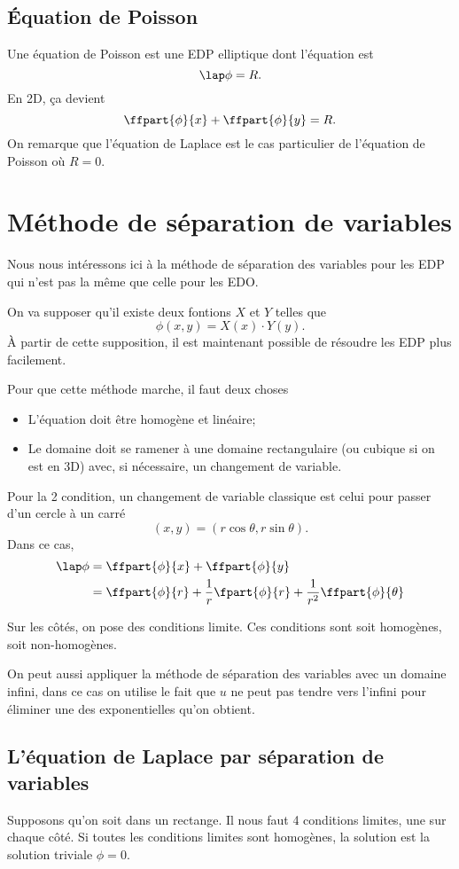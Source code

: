 \subsection{Équation de Poisson}
Une équation de Poisson est une EDP elliptique dont l'équation est
\[ \lap \phi = R. \]
En 2D, ça devient
\[ \ffpart{\phi}{x} + \ffpart{\phi}{y} = R. \]
On remarque que l'équation de Laplace est le cas particulier de
l'équation de Poisson où $R = 0$.

\section{Méthode de séparation de variables}
Nous nous intéressons ici à la méthode de séparation des variables pour les EDP
qui n'est pas la même que celle pour les EDO.

On va supposer qu'il existe deux fontions $X$ et $Y$ telles que
\[ \phi(x, y) = X(x) \cdot Y(y). \]
À partir de cette supposition, il est maintenant possible de résoudre
les EDP plus facilement.

Pour que cette méthode marche, il faut deux choses
\begin{itemize}
  \item L'équation doit être homogène et linéaire;
  \item Le domaine doit se ramener à une domaine rectangulaire
    (ou cubique si on est en 3D)
    avec, si nécessaire, un changement de variable.
\end{itemize}
Pour la 2\ieme{} condition, un changement de variable classique est
celui pour passer d'un cercle à un carré
\[ (x, y) = (r\cos\theta, r\sin\theta). \]
Dans ce cas,
\begin{align*}
  \lap \phi & = \ffpart{\phi}{x} + \ffpart{\phi}{y}\\
  & = \ffpart{\phi}{r} + \frac{1}{r}\fpart{\phi}{r}
  + \frac{1}{r^2}\ffpart{\phi}{\theta}
\end{align*}

Sur les côtés, on pose des conditions limite.
Ces conditions sont soit homogènes, soit non-homogènes.

On peut aussi appliquer la méthode de séparation des variables
avec un domaine infini, dans ce cas on utilise le fait
que $u$ ne peut pas tendre vers l'infini pour éliminer une des
exponentielles qu'on obtient.

\subsection{L'équation de Laplace par séparation de variables}
Supposons qu'on soit dans un rectange.
Il nous faut 4 conditions limites, une sur chaque côté.
Si toutes les conditions limites sont homogènes, la solution est la solution
triviale $\phi = 0$.

